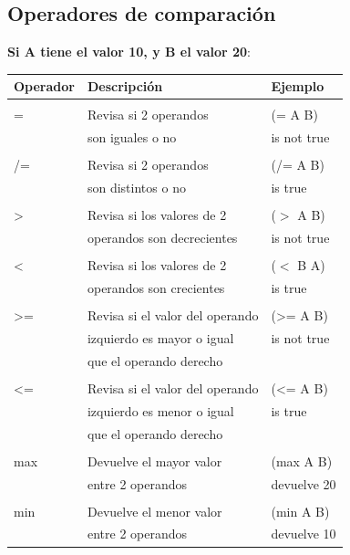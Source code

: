 \documentclass[10pt,journal,compsoc]{IEEEtran}
\begin{document}
\subsection{Operadores de comparaci\'on}
\textbf{Si A tiene el valor 10, y B el valor 20}:
\begin{tabular}{ l | l | l}
	\hline
	Operador & Descripci\'on & Ejemplo\\ 
	\hline\\
	= & Revisa si 2 operandos &  (= A B)\\&son iguales o no & is not true\\
	\hline\\
	/= & Revisa si 2 operandos & (/= A B)\\& son distintos o no& is true\\
	\hline\\
	> &Revisa si los valores de 2 & ($>$  A B)\\ &operandos son decrecientes & is not true\\
	\hline\\
	< & Revisa si los valores de 2 & ($<$ B A) \\ &operandos son crecientes &is true\\ 
	\hline\\
	>= & Revisa si el valor del operando &(>= A B)\\ & izquierdo es mayor o igual & is not true\\ & que el operando derecho \\
	\hline\\
	<= & Revisa si el valor del operando & (<= A B)\\ & izquierdo es menor o igual & is true \\ & que el operando derecho \\
	\hline\\
	max & Devuelve el mayor valor & (max A B)\\ & entre 2 operandos & devuelve 20\\
	\hline\\
	min & Devuelve el menor valor & (min A B)\\ & entre 2 operandos  & devuelve 10\\
\end{tabular}
\end{document}
